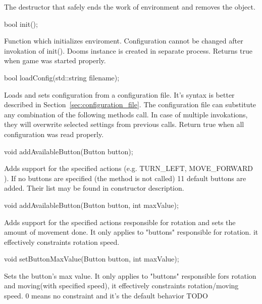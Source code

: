 The destructor that safely ends the work of environment and removes the object.


\vspace{20pt}
\begin{clinee}
bool init();
\end{clinee}

Function which initializes enviroment. Configuration cannot be changed after invokation of init(). Dooms instance is created in separate process. Returns true when game was started properly. 


\vspace{20pt}
\begin{clinee}
bool loadConfig(std::string filename);
\end{clinee}

Loads and sets configuration from a configuration file. It's syntax is better described in Section~\ref{sec:configuration_file}. The configuration file can substitute any combination of the following methods call. In case of multiple invokations, they will overwrite selected settings from previous calls. Return true when all configuration was read properly.


\vspace{20pt}
\begin{clinee}
void addAvailableButton(Button button);
\end{clinee}

Adds support for the specified actions (e.g. TURN\_LEFT, MOVE\_FORWARD ). If no buttons are specified (the method is not called) 11 default buttons are added. Their list may be found in constructor description.


\vspace{20pt}
\begin{clinee}
void addAvailableButton(Button button, int maxValue);
\end{clinee}

Adds support for the specified actions responsible for rotation and sets the amount of movement done. It only applies to "buttons" responsible for rotation. it effectively constraints rotation speed. %


\vspace{20pt}
\begin{clinee}
void setButtonMaxValue(Button button, int maxValue);
\end{clinee}

Sets the button's max value. It only applies to "buttons" responsible fors rotation and moving(with specified speed), it effectively constraints rotation/moving speed.
0 means no constraint and it's the default behavior TODO %


